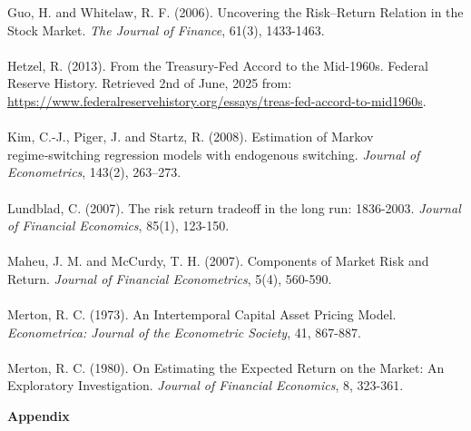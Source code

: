 \documentclass[12pt]{article}
\begin{document}
Guo, H. and Whitelaw, R. F. (2006).  Uncovering the Risk–Return Relation in the Stock Market. \textit{The Journal of Finance}, 61(3), 1433-1463.\\\\
Hetzel, R. (2013). From the Treasury-Fed Accord to the Mid-1960s. Federal Reserve History. Retrieved 2nd of June, 2025 from: \url{https://www.federalreservehistory.org/essays/treas-fed-accord-to-mid1960s}.\\\\
Kim, C.-J., Piger, J. and Startz, R. (2008). Estimation of Markov regime‑switching regression models with endogenous switching. \textit{Journal of Econometrics}, 143(2), 263–273.\\\\
Lundblad, C. (2007). The risk return tradeoff in the long run: 1836-2003. \textit{Journal of Financial Economics}, 85(1), 123-150.\\\\
Maheu, J. M. and McCurdy, T. H. (2007). Components of Market Risk and Return. \textit{Journal of Financial Econometrics}, 5(4), 560-590.\\\\
Merton, R. C. (1973). An Intertemporal Capital Asset Pricing Model. \textit{Econometrica: Journal of the Econometric Society}, 41, 867-887.\\\\
Merton, R. C. (1980). On Estimating the Expected Return on the Market: An Exploratory Investigation. \textit{Journal of Financial Economics}, 8, 323-361.\\

\newpage
{}
\vspace*{5cm}
\begin{center}
\huge{\textbf{Appendix}}
\end{center}
\newpage
\end{document}

